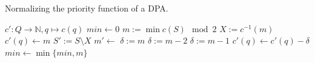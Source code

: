 \begin{algorithm}[h!]
  \caption{Normalizing the priority function of a DPA.}
  \label{alg:general:normalize_c}
  \begin{algorithmic}[1]
      \State $c' : Q \rightarrow \mathbb{N}, q \mapsto c(q)$
      \State {}
      \State {}
    \EndFunction
    \Statex
        \State {}
      \EndIf
      \State $min \gets 0$
        \State $m := \min c(S) \mod 2$
        \State $X := c^{-1}(m)$
          \State $c'(q) \gets m$
        \EndFor
        \State $S' := S \setminus X$
        \State $m' \gets $
            \State $\delta := m$
          \Else
            \State $\delta := m-2$
          \EndIf
        \Else
          \State $\delta := m-1$
        \EndIf
          \State $c'(q) \gets c'(q) - \delta$
        \EndFor
        \State $min \gets \min \{min, m\}$
      \EndFor
      \State {}
    \EndFunction
  \end{algorithmic}
\end{algorithm}








